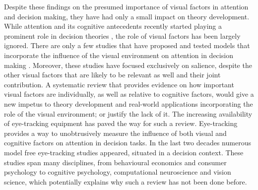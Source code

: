 Despite these findings on the presumed importance of visual factors in attention and decision making, they have had only a small impact on theory development. While attention and its cognitive antecedents recently started playing a prominent role in decision theories \citep{callaway2019a, gluth2018, gluth2020, krajbich2010a, noguchi2018, thomas2019, usher2019}, the role of visual factors has been largely ignored. There are only a few studies that have proposed and tested models that incorporate the influence of the visual environment on attention in decision making \citep{chen2013, navalpakkam2010, towal2013a}. Moreover, these studies have focused exclusively on salience, despite the other visual factors that are likely to be relevant as well and their joint contribution. A systematic review that provides evidence on how important visual factors are individually, as well as relative to cognitive factors, would give a new impetus to theory development and real-world applications incorporating the role of the visual environment; or justify the lack of it. The increasing availability of eye-tracking equipment has paved the way for such a review. Eye-tracking provides a way to unobtrusively measure the influence of both visual and cognitive factors on attention in decision tasks. In the last two decades numerous model free eye-tracking studies appeared, situated in a decision context. These studies span many disciplines, from behavioural economics and consumer psychology to cognitive psychology, computational neuroscience and vision science, which potentially explains why such a review has not been done before.\\

